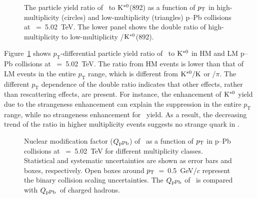 \begin{figure}[!hbt]
	\centering
	\caption{The particle yield ratio of \fzero~to $\rm{}K^{*0}$(892) as a function of $p_{\rm{T}}$ in high-multiplicity (circles) and low-multiplicity (triangles) p--Pb collisions at \snn~=~5.02~TeV. The lower panel shows the double ratio of high-multiplicity to low-multiplicity \fzero/$\rm{}K^{*0}$(892).  }
	\label{fig:f0KsPt}
\end{figure}

Figure~\ref{fig:f0KsPt} shows $p_{\mathrm{T}}$-differential particle yield ratio of \fzero~to $\rm{}K^{*0}$ in HM and LM p--Pb collisions at \snn~=~5.02~TeV. The ratio from HM events is lower than that of LM events in the entire $p_{\mathrm{T}}$ range, which is different from $\rm{}K^{*0}/K$ or \fzero/$\pi$. The different $p_{\mathrm{T}}$ dependence of the double ratio indicates that other effects, rather than rescattering effects, are present. For instance, the enhancement of $\rm{}K^{*0}$ yield due to the strangeness enhancement can explain the suppression in the entire $p_{\mathrm{T}}$ range, while no strangeness enhancement for \fzero~yield. As a result, the decreasing trend of the ratio in higher multiplicity events suggests no strange quark in \fzero.

\begin{figure}[!hbt]
	\centering
	\caption{ Nuclear modification factor ($Q_{\rm{pPb}}$) of \fzero~as a function of $p_{\rm{T}}$ in p--Pb collisions at \snn~=~5.02~TeV for different multiplicity classes. Statistical and systematic uncertainties are shown as error bars and boxes, respectively. Open boxes around $p_{\rm{T}}$~=~0.5~GeV/$c$ represent the binary collision scaling uncertainties. The $Q_{\rm{pPb}}$ of \fzero~is compared with $Q_{\rm{pPb}}$~of charged hadrons. }
	\label{fig:QpPb}
\end{figure}

